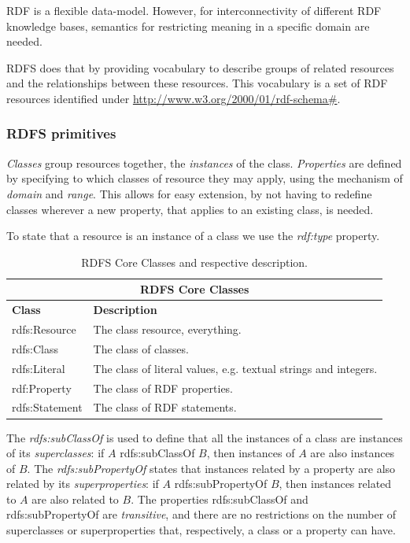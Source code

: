 \gls{RDF} is a flexible data-model. However, for interconnectivity of different \gls{RDF} knowledge bases, semantics for restricting meaning in a specific domain are needed.

\gls{RDFS} \autocite{W3c_undated-mp} does that by providing vocabulary to describe groups of related resources and the relationships between these resources. This vocabulary is a set of \gls{RDF} resources identified under \url{http://www.w3.org/2000/01/rdf-schema#}{}.

\subsubsection{RDFS primitives}

\emph{Classes} group resources together, the \emph{instances} of the class. \emph{Properties} are defined by specifying to which classes of resource they may apply, using the mechanism of \emph{domain} and \emph{range}. This allows for easy extension, by not having to redefine classes wherever a new property, that applies to an existing class, is needed.

To state that a resource is an instance of a class we use the \emph{rdf:type} property.

\begin{table}[h]
    \begin{center}
        \begin{tabular}{ |l|l| }
            \hline
            \multicolumn{2}{|c|}{\textbf{\gls{RDFS} Core Classes}} \\
            \hline
            \textbf{Class} & \textbf{Description} \\
            \hline
            rdfs:Resource & The class resource, everything. \\
            rdfs:Class & The class of classes. \\
            rdfs:Literal & The class of literal values, e.g. textual strings and integers. \\
            rdf:Property & The class of RDF properties. \\
            rdfs:Statement & The class of RDF statements. \\
            \hline
        \end{tabular}
    \end{center}
    \caption{\gls{RDFS} Core Classes and respective description.}
    \label{tbl:rdfs-classes}
\end{table}

The \emph{rdfs:subClassOf} is used to define that all the instances of a class are instances of its \emph{superclasses}: if $A$ rdfs:subClassOf $B$, then instances of $A$ are also instances of $B$. The \emph{rdfs:subPropertyOf} states that instances related by a property are also related by its \emph{superproperties}: if $A$ rdfs:subPropertyOf $B$, then instances related to $A$ are also related to $B$. The properties rdfs:subClassOf and rdfs:subPropertyOf are \emph{transitive}, and there are no restrictions on the number of superclasses or superproperties that, respectively, a class or a property can have.

